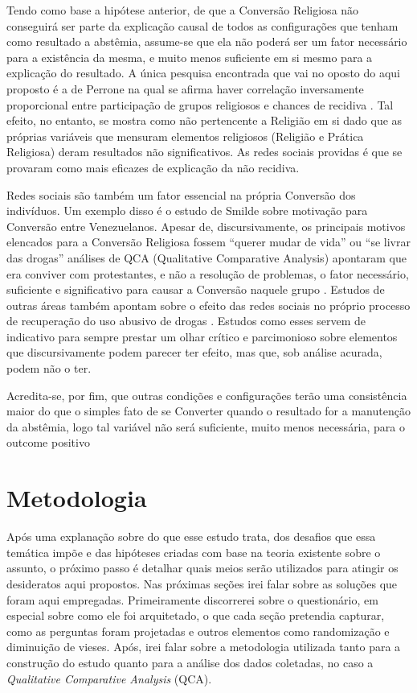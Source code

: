 \documentclass[
	12pt,				%
	oneside,			%
	a4paper,			%
	sumario=tradicional,
	english,			%
	brazil				%
	]{abntex2}
\begin{document}
Tendo como base a hipótese anterior, de que a Conversão Religiosa não conseguirá ser parte da explicação causal de todos as configurações que tenham como resultado a abstêmia, assume-se que ela não poderá ser um fator necessário para a existência da mesma, e muito menos suficiente em si mesmo para a explicação do resultado. A única pesquisa encontrada que vai no oposto do aqui proposto é a de Perrone \autocite*{perrone_fatores_2019} na qual se afirma haver correlação inversamente proporcional entre participação de grupos religiosos e chances de recidiva \autocite[142]{perrone_fatores_2019}. Tal efeito, no entanto, se mostra como não pertencente a Religião em si dado que as próprias variáveis que mensuram elementos religiosos (Religião e Prática Religiosa) deram resultados não significativos. As redes sociais providas é que se provaram como mais eficazes de explicação da não recidiva.

Redes sociais são também um fator essencial na própria Conversão dos indivíduos. Um exemplo disso é o estudo de Smilde \autocite*{smilde_qualitative_2005} sobre motivação para Conversão entre Venezuelanos. Apesar de, discursivamente, os principais motivos elencados para a Conversão Religiosa fossem ``querer mudar de vida'' ou ``se livrar das drogas'' análises de QCA (Qualitative Comparative Analysis) apontaram que era conviver com protestantes, e não a resolução de problemas, o fator necessário, suficiente e significativo para causar a Conversão naquele grupo \autocite[766]{smilde_qualitative_2005}. Estudos de outras áreas também apontam sobre o efeito das redes sociais no próprio processo de recuperação do uso abusivo de drogas \autocite{costa2001processo}. Estudos como esses servem de indicativo para sempre prestar um olhar crítico e parcimonioso sobre elementos que discursivamente podem parecer ter efeito, mas que, sob análise acurada, podem não o ter.

Acredita-se, por fim, que outras condições e configurações terão uma consistência maior do que o simples fato de se Converter quando o resultado for a manutenção da abstêmia, logo tal variável não será suficiente, muito menos necessária, para o outcome positivo

\newpage

\hypertarget{metodologia}{%
\chapter{Metodologia}\label{metodologia}}

Após uma explanação sobre do que esse estudo trata, dos desafios que essa temática impõe e das hipóteses criadas com base na teoria existente sobre o assunto, o próximo passo é detalhar quais meios serão utilizados para atingir os desideratos aqui propostos. Nas próximas seções irei falar sobre as soluções que foram aqui empregadas. Primeiramente discorrerei sobre o questionário, em especial sobre como ele foi arquitetado, o que cada seção pretendia capturar, como as perguntas foram projetadas e outros elementos como randomização e diminuição de vieses. Após, irei falar sobre a metodologia utilizada tanto para a construção do estudo quanto para a análise dos dados coletadas, no caso a \emph{Qualitative Comparative Analysis} (QCA).
\end{document}
